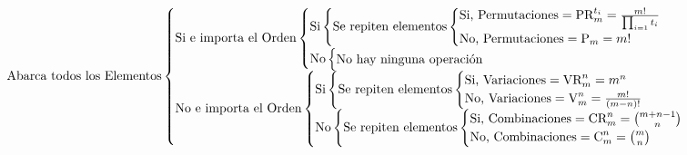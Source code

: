 \[
        \hspace*{-2.5cm} \textnormal{Abarca todos los Elementos}
        \begin{cases}
                \textnormal{Si e importa el Orden}
                \begin{cases}
                        \textnormal{Si}
                        \begin{cases}
                                \textnormal{Se repiten elementos}
                                \begin{cases}
                                        \textnormal{Si, Permutaciones} = \textnormal{PR}^{t_i}_{m} = \frac{m!}{\prod_{i=1}t_i } \\
                                        \textnormal{No, Permutaciones} = \textnormal{P}_m = m!
                                \end{cases}
                        \end{cases}
                        \\
                        \textnormal{No}\begin{cases}
                                \textnormal{No hay ninguna operación}
                        \end{cases}
                \end{cases} \\
                \textnormal{No e importa el Orden}
                \begin{cases}
                        \textnormal{Si}
                        \begin{cases}
                                \textnormal{Se repiten elementos}
                                \begin{cases}
                                        \textnormal{Si, Variaciones} = \textnormal{VR}_m^n=m^n \\
                                        \textnormal{No, Variaciones} = \textnormal{V}^n_m = \frac{m!}{(m-n)!}
                                \end{cases}
                        \end{cases}
                        \\
                        \textnormal{No}\begin{cases}
                                \textnormal{Se repiten elementos}
                                \begin{cases}
                                        \textnormal{Si, Combinaciones} = \textnormal{CR}_m^n=\binom{m+n-1}{n} \\
                                        \textnormal{No, Combinaciones} = \textnormal{C}^n_m = \binom{m}{n}
                                \end{cases}
                        \end{cases}
                \end{cases}
        \end{cases}
\]

